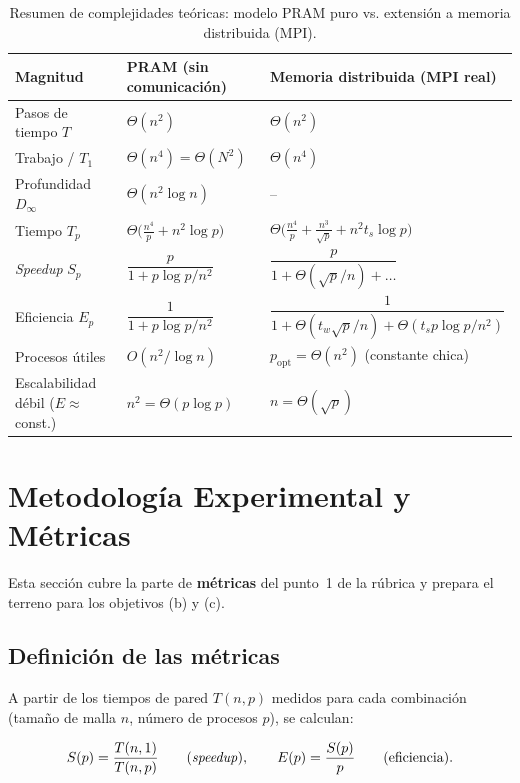 \documentclass[11pt,a4paper]{article}
\begin{document}
	\begin{table}[H]
	\centering
	\small
	\begin{tabular}{lll}
		\toprule
		\textbf{Magnitud} & \textbf{PRAM (sin comunicación)} & \textbf{Memoria distribuida (MPI real)} \\
		\midrule
		Pasos de tiempo $T$ & $\Theta(n^2)$ & $\Theta(n^2)$ \\
		Trabajo / $T_1$ & $\Theta(n^4)=\Theta(N^2)$ & $\Theta(n^4)$ \\
		Profundidad $D_\infty$ & $\Theta(n^2\log n)$ & -- \\
		Tiempo $T_p$ & $\Theta\!\big(\tfrac{n^4}{p}+n^2\log p\big)$ &
			$\Theta\!\big(\tfrac{n^4}{p}+\tfrac{n^3}{\sqrt p}+n^2 t_s\log p\big)$ \\
		\textit{Speedup} $S_p$ & $\dfrac{p}{1+p\log p/n^2}$ & $\dfrac{p}{1+\Theta(\sqrt p/n)+\dots}$ \\
		Eficiencia $E_p$ & $\dfrac{1}{1+p\log p/n^2}$ &
			$\dfrac{1}{1+\Theta(t_w\sqrt p/n)+\Theta(t_s p\log p/n^2)}$ \\
		Procesos útiles & $O(n^2/\log n)$ & $p_{\text{opt}}=\Theta(n^2)$ (constante chica) \\
		Escalabilidad débil ($E\approx$ const.) & $n^2=\Theta(p\log p)$ & $n=\Theta(\sqrt p)$ \\
		\bottomrule
	\end{tabular}
	\caption{Resumen de complejidades teóricas: modelo PRAM puro vs. extensión a memoria distribuida (MPI).}
	\label{tab:resumen-pram}
	\end{table}

	\section{Metodología Experimental y Métricas}
	\label{sec:metodo-experimental}

	Esta sección cubre la parte de \textbf{métricas} del punto~1 de la rúbrica y
	prepara el terreno para los objetivos (b) y (c).

	\subsection{Definición de las métricas}
	\label{sec:metricas}

	A partir de los tiempos de pared $T(n,p)$ medidos para cada combinación
	(tamaño de malla $n$, número de procesos $p$), se calculan:

	\[
	S(p) = \frac{T(n,1)}{T(n,p)} \qquad\text{(\textit{speedup})}, \qquad
	E(p) = \frac{S(p)}{p} \qquad\text{(eficiencia)}.
	\]
\end{document}
